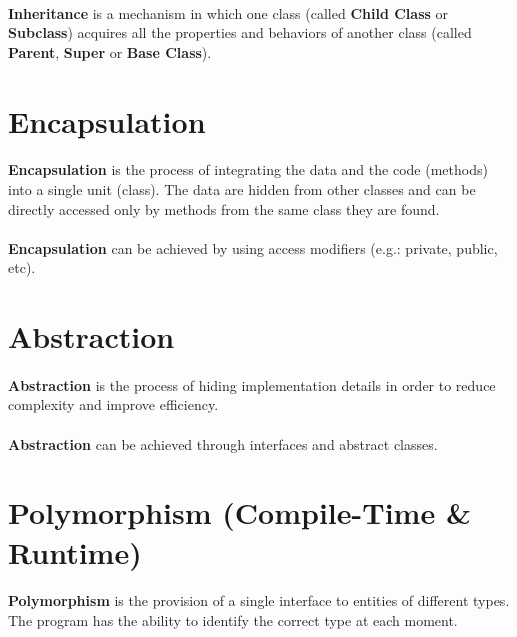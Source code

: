\documentclass{article}
\begin{document}
\paragraph{} \textbf{Inheritance} is a mechanism in which one class (called \textbf{Child Class} or \textbf{Subclass}) acquires all the properties and behaviors of another class (called \textbf{Parent}, \textbf{Super} or \textbf{Base Class}).


\section{Encapsulation}
\label{sec:encapsulation}
\paragraph{} \textbf{Encapsulation} is the process of integrating the data and the code (methods) into a single unit (class). The data are hidden from other classes and can be directly accessed only by methods from the same class they are found.
\paragraph{} \textbf{Encapsulation} can be achieved by using access modifiers (\acs{e.g.}: private, public, etc).


\section{Abstraction}
\label{sec:abstraction}
\paragraph{} \textbf{Abstraction} is the process of hiding implementation details in order to reduce complexity and improve efficiency.
\paragraph{} \textbf{Abstraction} can be achieved through interfaces and abstract classes.


\section{Polymorphism (Compile-Time \& Runtime)}
\label{sec:polymorphism}
\paragraph{} \textbf{Polymorphism} is the provision of a single interface to entities of different types. The program has the ability to identify the correct type at each moment.
\end{document}
